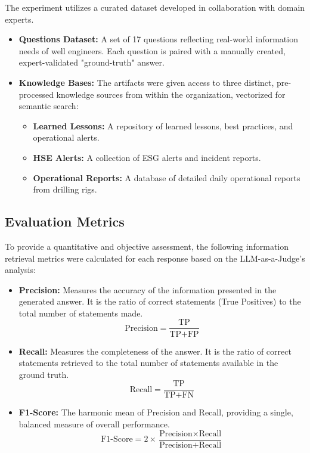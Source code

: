         The experiment utilizes a curated dataset developed in collaboration with domain experts.
        \begin{itemize}
            \item \textbf{Questions Dataset:} A set of 17 questions reflecting real-world information needs of well engineers. Each question is paired with a manually created, expert-validated "ground-truth" answer.
            \item \textbf{Knowledge Bases:} The artifacts were given access to three distinct, pre-processed knowledge sources from within the organization, vectorized for semantic search:
            \begin{itemize}
                \item \textbf{Learned Lessons:} A repository of learned lessons, best practices, and operational alerts.
                \item \textbf{HSE Alerts:} A collection of ESG alerts and incident reports.
                \item \textbf{Operational Reports:} A database of detailed daily operational reports from drilling rigs.
            \end{itemize}
        \end{itemize}

    \subsection{Evaluation Metrics}

        To provide a quantitative and objective assessment, the following information retrieval metrics were calculated for each response based on the LLM-as-a-Judge's analysis:
        \begin{itemize}
            \item \textbf{Precision:} Measures the accuracy of the information presented in the generated answer. It is the ratio of correct statements (True Positives) to the total number of statements made. 
            $$ \text{Precision} = \frac{\text{TP}}{\text{TP} + \text{FP}} $$
            \item \textbf{Recall:} Measures the completeness of the answer. It is the ratio of correct statements retrieved to the total number of statements available in the ground truth.
            $$ \text{Recall} = \frac{\text{TP}}{\text{TP} + \text{FN}} $$
            \item \textbf{F1-Score:} The harmonic mean of Precision and Recall, providing a single, balanced measure of overall performance.
            $$ \text{F1-Score} = 2 \times \frac{\text{Precision} \times \text{Recall}}{\text{Precision} + \text{Recall}} $$
        \end{itemize}

